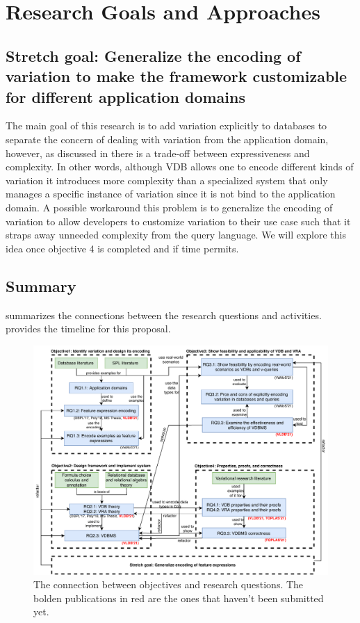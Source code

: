 \section{Research Goals and Approaches}
\label{sec:goals}







\subsection{Stretch goal: Generalize the encoding of variation to make the framework
customizable for different application domains}
\label{sec:ro5}

The main goal of this research is to add variation explicitly to 
databases to separate the concern of dealing with variation from the application
domain, however, as discussed in  there is a trade-off between 
 expressiveness and complexity. In other words, although VDB allows 
one to encode different kinds of variation it introduces more complexity than a
specialized system that only manages a specific instance of variation
since it is not bind to the application domain. 
A possible workaround this problem is to generalize the encoding of
variation to allow developers to customize variation to their use case such 
that it straps away unneeded complexity from the query language. We will 
explore this idea once objective 4 is completed and if time permits. 

\subsection{Summary}
\label{sec:sum}

 summarizes the connections between the research questions and activities.
 provides the timeline for this proposal.



\begin{figure}
\centering
\includegraphics[scale = 0.8] {figs/conn.pdf}
\caption{The connection between objectives and research questions.
The bolden publications in red are the ones that haven't been submitted yet.}
\label{fig:conn}
\end{figure}

